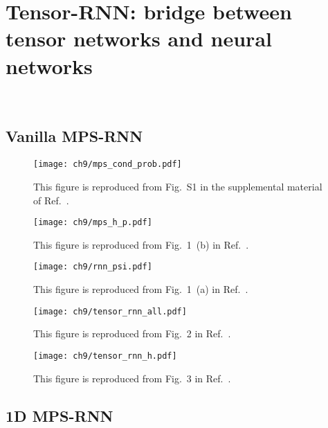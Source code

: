 \chapter{Tensor-RNN: bridge between tensor networks and neural networks}
\label{ch:tensor-rnn}

~\cite{gao2017efficient}

\section{Vanilla MPS-RNN}

\begin{figure}[htb]
\centering
\texttt{[image: ch9/mps\_cond\_prob.pdf]}
\caption[Tensor diagram for conditional probability in MPS]{
This figure is reproduced from Fig.~S1 in the supplemental material of Ref.~\cite{wu2023tensor}.
}
\label{fig:mps-cond-prob}
\end{figure}

\begin{figure}[htb]
\centering
\texttt{[image: ch9/mps\_h\_p.pdf]}
\caption[Tensor diagram for memory update of vanilla MPS-RNN]{
This figure is reproduced from Fig.~1~(b) in Ref.~\cite{wu2023tensor}.
}
\label{fig:mps-h-p}
\end{figure}

\begin{figure}[htb]
\centering
\texttt{[image: ch9/rnn\_psi.pdf]}
\caption[Computational graph for vanilla MPS-RNN]{
This figure is reproduced from Fig.~1~(a) in Ref.~\cite{wu2023tensor}.
}
\label{fig:rnn-psi}
\end{figure}

\begin{figure}[htb]
\centering
\texttt{[image: ch9/tensor\_rnn\_all.pdf]}
\caption[Computational graph for tensor-RNN]{
This figure is reproduced from Fig.~2 in Ref.~\cite{wu2023tensor}.
}
\label{fig:tensor-rnn-all}
\end{figure}

\begin{figure}[htb]
\centering
\texttt{[image: ch9/tensor\_rnn\_h.pdf]}
\caption[Tensor diagram for memory update of tensor-RNN]{
This figure is reproduced from Fig.~3 in Ref.~\cite{wu2023tensor}.
}
\label{fig:tensor-rnn-h}
\end{figure}

\section{1D MPS-RNN}

